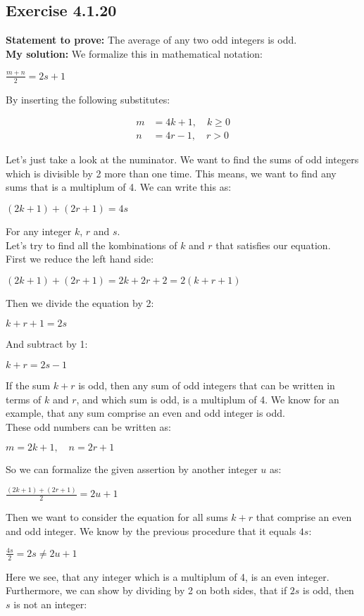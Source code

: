 \documentclass{report}
\newcommand{\cent}[1]{\begin{center}#1\end{center}}
\newcommand{\mAlign}[1]{\begin{align*}#1\end{align*}}
\newcommand{\Prove}{\textbf{Statement to prove: }}
\newcommand{\solution}{\textbf{My solution: }}
\newcommand{\Exercise}[1]{\subsection{Exercise #1}}
\begin{document}
	\Exercise{4.1.20}
	\Prove
	The average of any two odd integers is odd.\\
	
	\solution
	We formalize this in mathematical notation:
	
	\cent{$\frac{m +n }{2} = 2s + 1$}
	
	By inserting the following substitutes:
	
	\mAlign{m &= 4k + 1, \quad  k \geq 0\\
				  n &= 4r -1, \quad r > 0}
	
	Let's just take a look at the numinator. We want to find the sums of odd integers which is divisible by 2 more than one time. This means, we want to find any sums that is a multiplum of 4. We can write this as:
	
	\cent{$(2k+1)+(2r+1)=4s$}
	
	For any integer $k$, $r$ and $s$.\\
	
	Let's try to find all the kombinations of $k$ and $r$ that satisfies our equation.\\
	
	First we reduce the left hand side:
	
	\cent{$(2k+1)+ (2r+1) = 2k + 2r + 2 = 2(k+r + 1 )$}
	
	Then we divide the equation by 2:
	
	\cent{$k+r+1=2s$}
	
	And subtract by 1:
	
	\cent{$k+r=2s-1$}
	
	If the sum $k+r$ is odd, then any sum of odd integers that can be written in terms of $k$ and $r$, and which sum is odd, is a multiplum of 4. We know for an example, that any sum comprise an even and odd integer is odd.\\
	
	These odd numbers can be written as:
		
	\cent{$m = 2k+1, \quad n = 2r+1 $}
	
	So we can formalize the given assertion by another integer $u$ as:
	
	\cent{$\frac{(2k+1) + (2r+1)}{2} = 2u +1$}
	
	Then we want to consider the equation for all sums $k+r$ that comprise an even and odd integer. We know by the previous procedure that it equals $4s$:
	
	\cent{$\frac{4s}{2} = 2s \neq 2u +1$}
	
	Here we see, that any integer which is a multiplum of 4, is an even integer. Furthermore, we can show by dividing by 2 on both sides, that if $2s$ is odd, then $s$ is not an integer:
	
\end{document}
